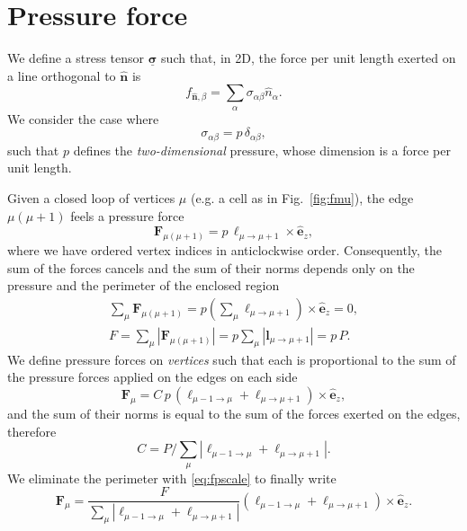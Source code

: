 \documentclass[aps, superscriptaddress, notitlepage, longbibliography]{revtex4-1}
\begin{document}
\section{Pressure force}

We define a stress tensor $\underline{\boldsymbol{\sigma}}$ such that, in 2D, the force per unit length exerted on a line orthogonal to $\hat{\boldsymbol{n}}$ is
\begin{equation}
f_{\hat{\boldsymbol{n}},\beta} = \sum_{\alpha} \sigma_{\alpha\beta} \hat{n}_{\alpha}.
\end{equation}
We consider the case where
\begin{equation}
\sigma_{\alpha\beta} = p \, \delta_{\alpha\beta},
\end{equation}
such that $p$ defines the \textit{two-dimensional} pressure, whose dimension is a force per unit length.

Given a closed loop of vertices $\mu$ (e.g. a cell as in Fig.~\ref{fig:fmu}), the edge $\mu(\mu + 1)$ feels a pressure force
\begin{equation}
\boldsymbol{F}_{\mu(\mu + 1)} = p \, \boldsymbol{\ell}_{\mu \to \mu + 1} \times \hat{\boldsymbol{e}}_z,
\end{equation}
where we have ordered vertex indices in anticlockwise order. Consequently, the sum of the forces cancels and the sum of their norms depends only on the pressure and the perimeter of the enclosed region
\begin{subequations}
\begin{align}
\sum_{\mu} \boldsymbol{F}_{\mu(\mu + 1)} = p \left(\sum_{\mu} \boldsymbol{\ell}_{\mu \to \mu + 1}\right) \times \hat{\boldsymbol{e}}_z = 0,\\
\label{eq:fpscale}
F = \sum_{\mu} |\boldsymbol{F}_{\mu(\mu + 1)}| = p \sum_{\mu} |\boldsymbol{l}_{\mu \to \mu + 1}| = p \, P.
\end{align}
\end{subequations}
We define pressure forces on \textit{vertices} such that each is proportional to the sum of the pressure forces applied on the edges on each side
\begin{equation}
\boldsymbol{F}_{\mu} = C \, p \, \left(\boldsymbol{\ell}_{\mu - 1 \to \mu} + \boldsymbol{\ell}_{\mu \to \mu + 1}\right) \times \hat{\boldsymbol{e}}_z,
\end{equation}
and the sum of their norms is equal to the sum of the forces exerted on the edges, therefore
\begin{equation}
C = P/\sum_{\mu} \left|\boldsymbol{\ell}_{\mu - 1 \to \mu} + \boldsymbol{\ell}_{\mu \to \mu + 1}\right|.
\end{equation}
We eliminate the perimeter with \eqref{eq:fpscale} to finally write
\begin{equation}
\boldsymbol{F}_{\mu} = \frac{F}{\sum_{\mu} \left|\boldsymbol{\ell}_{\mu - 1 \to \mu} + \boldsymbol{\ell}_{\mu \to \mu + 1}\right|} \left(\boldsymbol{\ell}_{\mu - 1 \to \mu} + \boldsymbol{\ell}_{\mu \to \mu + 1}\right) \times \hat{\boldsymbol{e}}_z.
\end{equation}


\end{document}
